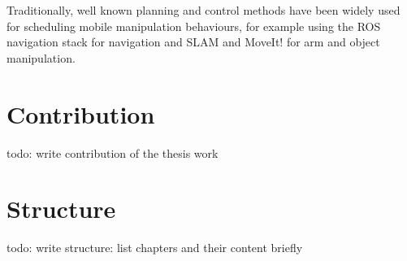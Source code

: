 Traditionally, well known planning and control methods have been widely used for scheduling
mobile manipulation behaviours, for example using the ROS navigation stack for navigation and SLAM
and MoveIt! for arm and object manipulation.

\section{Contribution}

todo: write contribution of the thesis work

\section{Structure}

todo: write structure: list chapters and their content briefly


